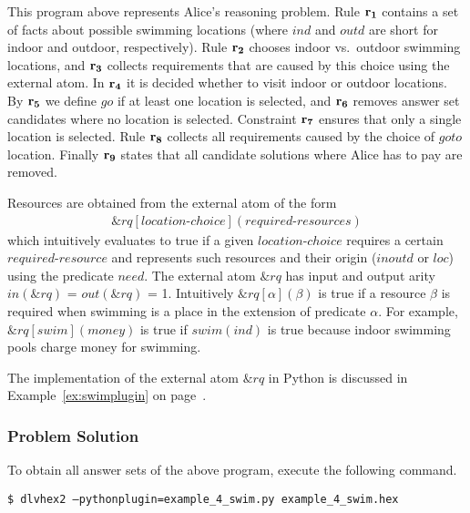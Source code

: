 \documentclass[a4paper, titlepage]{article}
\newcommand{\ext}[3]{\ensuremath{\&{\mathit{#1}}[#2](#3)}}
\newcommand\leftaligned[1]{\par \smallskip \noindent \qquad #1 \smallskip \par}
\newcommand{\row}[1]{%
  \ensuremath{\color{black}\ensuremath{\mathbf{#1}} \color{black}}%
}
\begin{document}
This program above represents Alice's reasoning 
problem. Rule $\row{r_1}$ contains a set of facts about possible 
swimming locations (where $\mathit{ind}$ and 
$\mathit{outd}$ are short for indoor and outdoor, 
respectively). Rule $\row{r_2}$ chooses indoor vs.\ outdoor 
swimming locations, and $\row{r_3}$ collects requirements that 
are caused by this choice using the external atom. 
%
In $\row{r_4}$ it is decided whether to visit indoor or outdoor locations.
By $\row{r_5}$ we define $go$ if at least one location is selected,
and $\row{r_6}$ removes answer set candidates where no location is selected.
Constraint $\row{r_7}$ ensures that only a single location is selected.
Rule $\row{r_8}$ collects all requirements caused by 
the choice of $\mathit{goto}$ location.
Finally $\row{r_9}$ states that all candidate solutions where 
Alice has to pay are removed.

Resources are obtained from the external atom of the form
\begin{align*}
  \ext{\mathit{rq}}{\mathit{location}\text{-}\mathit{choice}}%
  {\mathit{required}\text{-}\mathit{resources}}
\end{align*}
which intuitively 
evaluates to true if a given $\mathit{location}$-$\mathit{choice}$ 
requires a certain $\mathit{required}$-$\mathit{resource}$ and 
represents such resources  and their origin 
($\mathit{inoutd}$ or $\mathit{loc}$) using the predicate 
$\mathit{need}$. The external atom $\mathit{\&rq}$ has 
input and output arity $\mathit{in(\&rq)}$ = 
$\mathit{out(\&rq)}$ = 1. Intuitively  $\ext{\mathit{rq}}
{\mathit{\alpha}}{\mathit{\beta}}$ is true if a resource 
$\beta$ is required when swimming is a place in the 
extension of predicate $\alpha$. For example, 
$\ext{\mathit{rq}}{\mathit{swim}}{\mathit{money}}$ is true 
if $\mathit{swim(ind)}$ is true because indoor swimming 
pools charge money for swimming. 

The implementation of the external atom $\&rq$ in Python
is discussed in Example~\ref{ex:swimplugin} on page~\pageref{ex:swimplugin}.

\subsubsection{Problem Solution}

To obtain all answer sets of the above program,
execute the following command.

\leftaligned{\texttt{\$ dlvhex2 --pythonplugin=example\_4\_swim.py example\_4\_swim.hex}}
\end{document}
